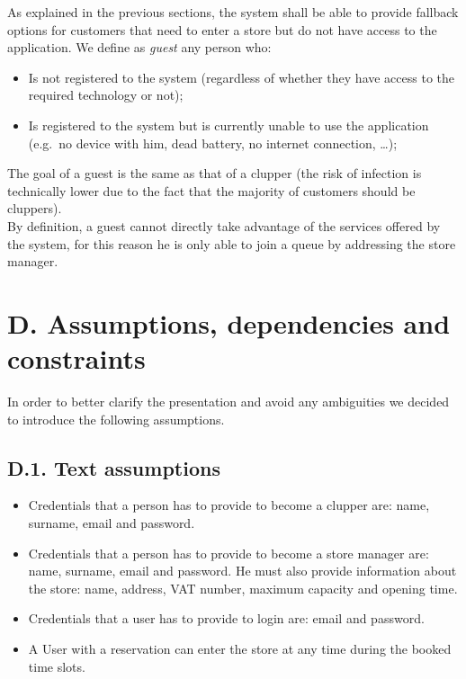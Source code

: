 As explained in the previous sections, the system shall be able to provide fallback options for customers that need to enter a store but do not have access to the application. We define as \emph{guest} any person who:
\begin{itemize}
\tightlist
\item
    Is not registered to the system (regardless of whether they have access to the required technology or not);
\item
    Is registered to the system but is currently unable to use the application (e.g.~no device with him, dead battery, no internet connection, \ldots);
\end{itemize}

The goal of a guest is the same as that of a clupper (the risk of infection is technically lower due to the fact that the majority of customers should be cluppers).\\
By definition, a guest cannot directly take advantage of the services offered by the system, for this reason he is only able to join a queue by addressing the store manager.

\clearpage
\section{D. Assumptions, dependencies and constraints}

In order to better clarify the presentation and avoid any ambiguities we decided to introduce the following assumptions.

\subsection{D.1. Text assumptions}

\begin{itemize}
\item
  Credentials that a person has to provide to become a clupper are: name, surname, email and password.
\item
  Credentials that a person has to provide to become a store manager are: name, surname, email and password. He must also provide information about the store: name, address, VAT number, maximum capacity and opening time.
\item
  Credentials that a user has to provide to login are: email and password.
\item
  A User with a reservation can enter the store at any time during the booked time slots.
\end{itemize}

